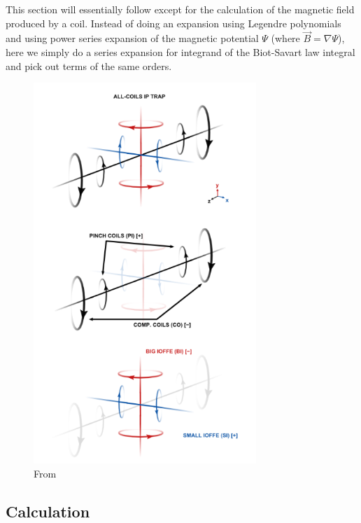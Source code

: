 \documentclass{article}
\theoremstyle{definition}
\begin{document}
This section will essentially follow \cite{allcoil} except for the calculation of the magnetic field produced by a coil. Instead of doing an expansion using Legendre polynomials and using power series expansion of the magnetic potential $\Psi$ (where $\vec{B} = \nabla \Psi$), here we simply do a series expansion for integrand of the Biot-Savart law integral and pick out terms of the same orders.  



\begin{figure}[!htb]
	\centering
	\includegraphics[width=0.75\textwidth]{all-coils.png}
	\caption{From \cite{allcoil}}
\end{figure}

\subsection{Calculation}
\end{document}
